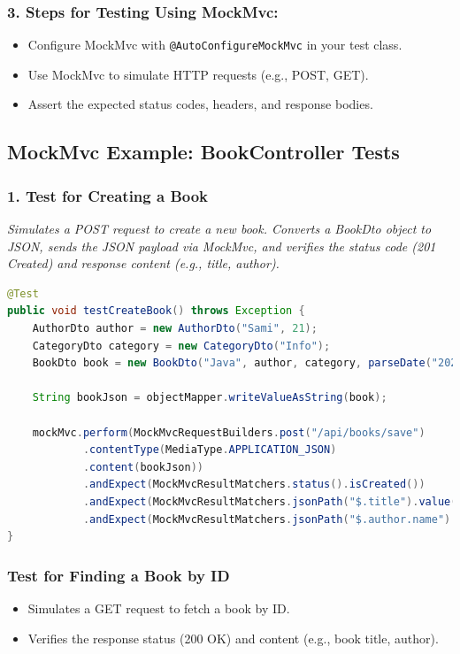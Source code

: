 \documentclass[a4paper,12pt]{article}
\begin{document}
\subsubsection{3. Steps for Testing Using MockMvc:}
\begin{itemize}
    \item Configure MockMvc with \texttt{@AutoConfigureMockMvc} in your test class.
    \item Use MockMvc to simulate HTTP requests (e.g., POST, GET).
    \item Assert the expected status codes, headers, and response bodies.
\end{itemize}

\subsection{MockMvc Example: BookController Tests}
\subsubsection{1. Test for Creating a Book}
\textit{Simulates a POST request to create a new book. Converts a BookDto object to JSON, sends the JSON payload via MockMvc, and verifies the status code (201 Created) and response content (e.g., title, author).}

\newpage
\begin{lstlisting}[language=Java]
@Test
public void testCreateBook() throws Exception {
    AuthorDto author = new AuthorDto("Sami", 21);
    CategoryDto category = new CategoryDto("Info");
    BookDto book = new BookDto("Java", author, category, parseDate("2024-11-20"));

    String bookJson = objectMapper.writeValueAsString(book);

    mockMvc.perform(MockMvcRequestBuilders.post("/api/books/save")
            .contentType(MediaType.APPLICATION_JSON)
            .content(bookJson))
            .andExpect(MockMvcResultMatchers.status().isCreated())
            .andExpect(MockMvcResultMatchers.jsonPath("$.title").value("Java"))
            .andExpect(MockMvcResultMatchers.jsonPath("$.author.name").value("Sami"));
}
\end{lstlisting}
\subsubsection{ Test for Finding a Book by ID}
\begin{itemize}
    \item Simulates a GET request to fetch a book by ID.
    \item Verifies the response status (200 OK) and content (e.g., book title, author).
\end{itemize}
\end{document}
